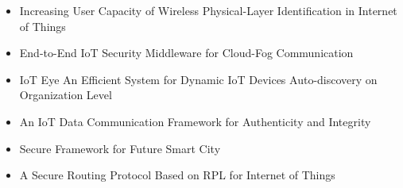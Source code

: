 \documentclass[journal, twocolumn, 10pt]{IEEEtran}
\begin{document}
\begin{itemize}
\item Increasing User Capacity of Wireless Physical-Layer Identification in Internet of Things~\cite{PLidentify}
\item End-to-End IoT Security Middleware for Cloud-Fog Communication~\cite{End2End}
\item IoT Eye An Efficient System for Dynamic IoT Devices Auto-discovery on Organization Level~\cite{IoTEye}
\item An IoT Data Communication Framework for Authenticity and Integrity~\cite{frameworkforIA}
\item Secure Framework for Future Smart City~\cite{SmartCity}
\item A Secure Routing Protocol Based on RPL for Internet of Things~\cite{RPL}
\end{itemize}


\end{document}
